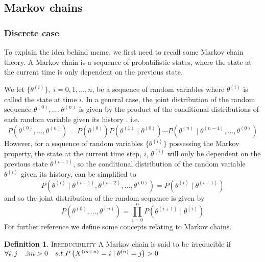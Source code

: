 \documentclass{article}
\theoremstyle{definition}
\newtheorem{definition}{Definition}[section]
\begin{document}
\subsection{Markov chains}\label{sec:markov}
\subsubsection{Discrete case}\label{subsec:markov_discrete}
To explain the idea behind \gls{mcmc}, we first need to recall some Markov chain theory. 
A Markov chain is a sequence of probabilistic states, where the state at the current time is only dependent on the previous state. 
\par
We let $\{\theta^{\left(i\right)}\}, \; i = 0, 1, \ldots, n$,  be a sequence of random variables where $\theta^{\left(i\right)}$ is called the state at time $i$. In a general case, the joint distribution of the random sequence $\theta^{(0)}, \ldots, \theta^{(n)}$ is given by the product of the conditional distributions of each random variable given its history \cite{CS}.  i.e. 
\begin{equation*}
    P\left(\theta^{(0)}, \ldots, \theta^{(n)}\right) = P\left(\theta^{(0)}\right) P\left(\theta^{(1)}\mid \theta^{(0)}\right)  \cdots  P\left(\theta^{(n)}\mid \theta^{(n-1 )},\ldots, \theta^{(0)}\right)
\end{equation*}
However, for a sequence of random variables $\{\theta^{(i)}\}$ possessing the Markov property, the state at the current time step,  $i$, $\theta^{(i)}$ will only be dependent on the previous state $\theta^{(i-1)}$, so the conditional distribution of the random variable $\theta^{(i)}$ given its history, can be simplified to
\begin{equation}\label{eq:markov}
    P\left(\theta^{(i)}\mid \theta^{(i-1)}, \theta^{(i-2)}, \ldots, \theta^{(0)}\right) = P\left(\theta^{(i)}\mid \theta^{(i-1)}\right)
\end{equation}
and so the joint distribution of the random sequence is given by 
\begin{equation*}
    P\left(\theta^{(0)}, \ldots, \theta^{(n)}\right) = \prod_{i = 0}^n P\left(\theta^{(i+1)}\mid \theta^{(i)}\right)
\end{equation*}
For further reference we define some concepts relating to Markov chains.
\theoremstyle{definition}
\begin{definition}{\textsc{Irreducibility}} A Markov chain is said to be irreducible if $\forall i, j \quad \exists m > 0 \quad s.t. \\ P\left(X^{(m+n)} = i\mid \theta^{(n)} = j \right) > 0$
\end{definition}
\end{document}

